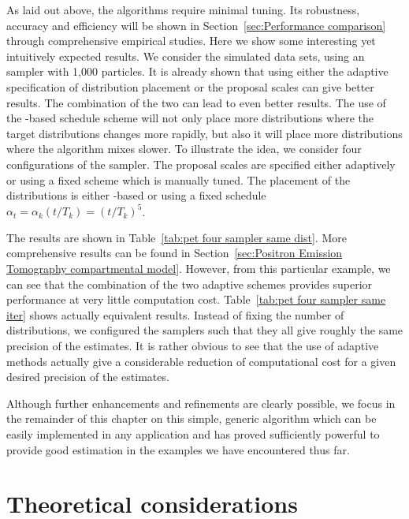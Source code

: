 As laid out above, the algorithms require minimal tuning. Its robustness,
accuracy and efficiency will be shown in Section~\ref{sec:Performance
  comparison} through comprehensive empirical studies. Here we show some
interesting yet intuitively expected results. We consider the simulated \pet
data sets, using an \smc[2] sampler with 1,000 particles. It is already shown
that using either the adaptive specification of distribution placement or the
\mcmc proposal scales can give better results. The combination of the two can
lead to even better results. The use of the \cess-based schedule scheme will
not only place more distributions where the target distributions changes more
rapidly, but also it will place more distributions where the \mcmc algorithm
mixes slower. To illustrate the idea, we consider four configurations of the
sampler. The proposal scales are specified either adaptively or using a fixed
scheme which is manually tuned. The placement of the distributions is either
\cess-based or using a fixed schedule $\alpha_t = \alpha_k(t/T_k) =
(t/T_k)^5$.



The results are shown in Table~\ref{tab:pet four sampler same dist}. More
comprehensive results can be found in Section~\ref{sec:Positron Emission
  Tomography compartmental model}. However, from this particular example, we
can see that the combination of the two adaptive schemes provides superior
performance at very little computation cost. Table~\ref{tab:pet four sampler
  same iter} shows actually equivalent results. Instead of fixing the number
of distributions, we configured the samplers such that they all give roughly
the same precision of the estimates. It is rather obvious to see that the use
of adaptive methods actually give a considerable reduction of computational
cost for a given desired precision of the estimates.



Although further enhancements and refinements are clearly possible, we focus
in the remainder of this chapter on this simple, generic algorithm which can
be easily implemented in any application and has proved sufficiently powerful
to provide good estimation in the examples we have encountered thus far.

\section{Theoretical considerations}
\label{sec:Theoretical considerations}

